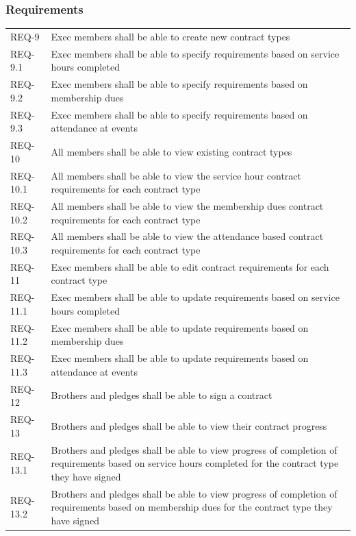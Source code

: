 \documentclass{article}
\newcommand{\req}[1]{REQ-{#1}}
\begin{document}
\newpage

\subsubsection{Requirements}

\begin{tabular}{lp{8cm}}
\req{9} & Exec members shall be able to create new contract types \\
\req{9.1} & Exec members shall be able to specify requirements based
on service hours completed\\
\req{9.2} & Exec members shall be able to specify requirements based
on membership dues\\
\req{9.3} & Exec members shall be able to specify requirements based
on attendance at events\\
\req{10} & All members shall be able to view existing contract types\\
\req{10.1} & All members shall be able to view the service hour
contract requirements for each contract type\\
\req{10.2} & All members shall be able to view the membership dues
contract requirements for each contract type\\
\req{10.3} & All members shall be able to view the attendance based
contract requirements for each contract type\\
\req{11} & Exec members shall be able to edit contract requirements for
each contract type \\
\req{11.1} & Exec members shall be able to update requirements based
on service hours completed\\
\req{11.2} & Exec members shall be able to update requirements based
on membership dues\\
\req{11.3} & Exec members shall be able to update requirements based
on attendance at events\\
\req{12} & Brothers and pledges shall be able to sign a contract \\
\req{13} & Brothers and pledges shall be able to view their contract
progress\\
\req{13.1} & Brothers and pledges shall be able to view progress of completion
of requirements based
on service hours completed for the contract type they have signed\\
\req{13.2} & Brothers and pledges shall be able to view progress of completion
of requirements based
on membership dues for the contract type they have signed\\

\end{tabular}
\end{document}
